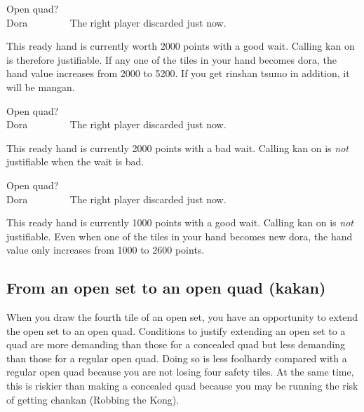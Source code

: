 \bigskip
\begin{itembox}[r]{Open quad?}
\bp
{}\zhong\zhong\zhong~~~\\
\hfill\footnotesize{{\jap Dora}~~~~~~~~}
\ep
\vspace{-20pt}The right player discarded {\LARGE\zhong} just now.
\end{itembox}
\noindent This ready hand is currently worth 2000 points with a good wait. Calling {\jap kan} on {\LARGE\zhong} is therefore justifiable. If any one of the tiles in your hand becomes {\jap dora}, the hand value increases from 2000 to 5200. If you get {\jap rinshan tsumo} in addition, it will be {\jap mangan}. 

\bigskip
\begin{itembox}[r]{Open quad?}
\bp
{}\zhong\zhong\zhong~~~\\
\hfill\footnotesize{{\jap Dora}~~~~~~~~}
\ep
\vspace{-20pt}The right player discarded {\LARGE\zhong} just now.
\end{itembox}
\noindent This ready hand is currently 2000 points with a bad wait. Calling {\jap kan} on {\LARGE\zhong} is \emph{not} justifiable when the wait is bad.

\bigskip
\begin{itembox}[r]{Open quad?}
\bp
{}\zhong\zhong\zhong~~~\\
\hfill\footnotesize{{\jap Dora}~~~~~~~~}
\ep
\vspace{-20pt}The right player discarded {\LARGE\zhong} just now.
\end{itembox}
\noindent This ready hand is currently 1000 points with a good wait. Calling {\jap kan} on {\LARGE\zhong} is \emph{not} justifiable. Even when one of the tiles in your hand becomes new {\jap dora}, the hand value only increases from 1000 to 2600 points. 

\subsection{From an open set to an open quad ({\jap kakan})}
When you draw the fourth tile of an open set, you have an opportunity to extend the open set to an open quad. Conditions to justify extending an open set to a quad are more demanding than those for a concealed quad but less demanding than those for a regular open quad. 
Doing so is less foolhardy compared with a regular open quad because you are not losing four safety tiles. At the same time, this is riskier than making a concealed quad because you may be running the risk of getting {\jap chankan} (Robbing the Kong). 


